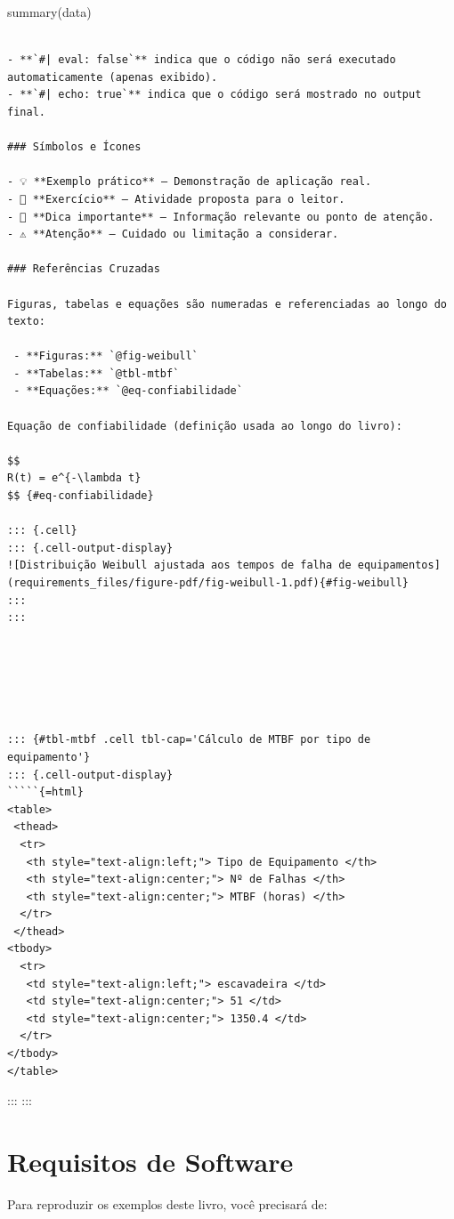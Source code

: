 \documentclass[
  letterpaper,
]{book}
\begin{document}
summary(data)

\begin{verbatim}

- **`#| eval: false`** indica que o código não será executado automaticamente (apenas exibido).
- **`#| echo: true`** indica que o código será mostrado no output final.

### Símbolos e Ícones

- 💡 **Exemplo prático** — Demonstração de aplicação real.
- 📝 **Exercício** — Atividade proposta para o leitor.
- 🔔 **Dica importante** — Informação relevante ou ponto de atenção.
- ⚠️ **Atenção** — Cuidado ou limitação a considerar.

### Referências Cruzadas

Figuras, tabelas e equações são numeradas e referenciadas ao longo do texto:

 - **Figuras:** `@fig-weibull`
 - **Tabelas:** `@tbl-mtbf`
 - **Equações:** `@eq-confiabilidade`

Equação de confiabilidade (definição usada ao longo do livro):

$$
R(t) = e^{-\lambda t}
$$ {#eq-confiabilidade}

::: {.cell}
::: {.cell-output-display}
![Distribuição Weibull ajustada aos tempos de falha de equipamentos](requirements_files/figure-pdf/fig-weibull-1.pdf){#fig-weibull}
:::
:::






::: {#tbl-mtbf .cell tbl-cap='Cálculo de MTBF por tipo de equipamento'}
::: {.cell-output-display}
`````{=html}
<table>
 <thead>
  <tr>
   <th style="text-align:left;"> Tipo de Equipamento </th>
   <th style="text-align:center;"> Nº de Falhas </th>
   <th style="text-align:center;"> MTBF (horas) </th>
  </tr>
 </thead>
<tbody>
  <tr>
   <td style="text-align:left;"> escavadeira </td>
   <td style="text-align:center;"> 51 </td>
   <td style="text-align:center;"> 1350.4 </td>
  </tr>
</tbody>
</table>
\end{verbatim}

::: :::

\section*{Requisitos de Software}\label{requisitos-de-software}


Para reproduzir os exemplos deste livro, você precisará de:
\end{document}
